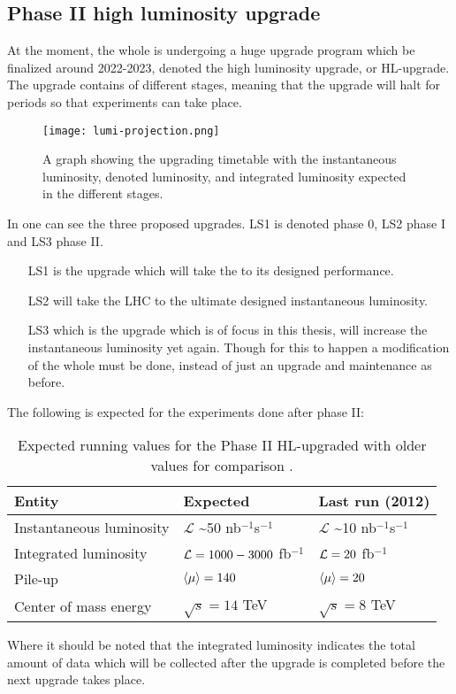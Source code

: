 \subsection{Phase II high luminosity upgrade}\label{sec:eo:subsec:hlu}
At the moment, the whole \abbrLHC is undergoing a huge upgrade program which be finalized around 2022-2023, denoted the high luminosity upgrade, or HL-upgrade. The upgrade contains of different stages, meaning that the upgrade will halt for periods so that experiments can take place. 
\begin{figure}[ht]
\texttt{[image: lumi-projection.png]}
\caption{A graph showing the upgrading timetable with the instantaneous luminosity, denoted luminosity, and integrated luminosity expected in the different stages.}
\label{fig:upgt}
\end{figure}
In  one can see the three proposed upgrades. LS1 is denoted phase 0, LS2 phase I and LS3 phase II. 
\begin{itemize}
\item[LS1] is the upgrade which will take the \abbrLHC to its designed performance. 

\item[LS2] will take the LHC to the ultimate designed instantaneous luminosity. 
\item[LS3] which is the upgrade which is of focus in this thesis, will increase the instantaneous luminosity yet again. Though for this to happen a modification of the whole \abbrLHC must be done, instead of just an upgrade and maintenance as before.
\end{itemize}
The following is expected for the experiments done after phase II:
\renewcommand{\arraystretch}{1.5} %
\begin{table}[H]
\begin{center}
    \begin{tabular}{ | l | l | l |}
    \hline
    Entity & Expected & Last run (2012) \\ \hline
    Instantaneous luminosity & $\mathscr{L}$ \textasciitilde 50 nb$^{-1}$s$^{-1}$ & $\mathscr{L}$ \textasciitilde 10 nb$^{-1}$s$^{-1}$ \\ \hline  
    Integrated luminosity & $\mathcal{L}=1000-3000$ fb$^{-1}$ & $\mathcal{L}=20$ fb$^{-1}$ \\ \hline
  	Pile-up & $\left<\mu\right>=140$ & $\left<\mu\right>=20$ \\ \hline
  	Center of mass energy & $\sqrt{s}=14$ TeV &  $\sqrt{s}=8$ TeV \\ \hline
  	\end{tabular}
  	
  	\caption{Expected running values for the Phase II HL-upgraded \abbrLHC with older values for comparison \citep{HL:2013}.}
  	\label{tab:expectvalues}
  	\end{center}
    \end{table}
    \renewcommand{\arraystretch}{1.0}  %
Where it should be noted that the integrated luminosity indicates the total amount of data which will be collected after the upgrade is completed before the next upgrade takes place. 


